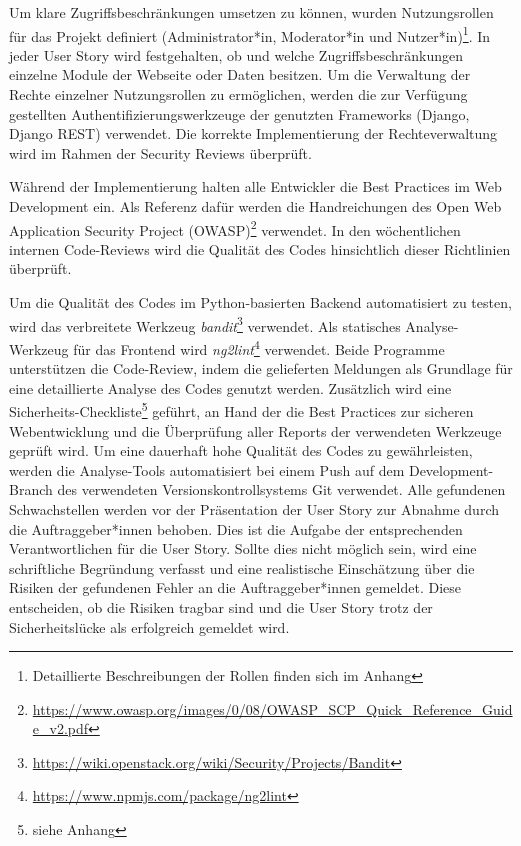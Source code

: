 \documentclass[accentcolor=tud0b,12pt,paper=a4]{tudreport}
\begin{document}
Um klare Zugriffsbeschränkungen umsetzen zu können, wurden Nutzungsrollen für das Projekt definiert (Administrator*in, Moderator*in und Nutzer*in)\footnote{Detaillierte Beschreibungen der Rollen finden sich im Anhang}. In jeder User Story wird festgehalten, ob und welche Zugriffsbeschränkungen einzelne Module der Webseite oder Daten besitzen. Um die Verwaltung der Rechte einzelner Nutzungsrollen zu ermöglichen, werden die zur Verfügung gestellten Authentifizierungswerkzeuge der genutzten Frameworks (Django, Django REST) verwendet. Die korrekte Implementierung der Rechteverwaltung wird im Rahmen der Security Reviews überprüft.

Während der Implementierung halten alle Entwickler die Best Practices im Web Development ein. Als Referenz dafür werden die Handreichungen des Open Web Application Security Project (OWASP)\footnote{\href{https://www.owasp.org/images/0/08/OWASP_SCP_Quick_Reference_Guide_v2.pdf}{https://www.owasp.org/images/0/08/OWASP\_SCP\_Quick\_Reference\_Guide\_v2.pdf}} verwendet. In den wöchentlichen internen Code-Reviews wird die Qualität des Codes hinsichtlich dieser Richtlinien überprüft.

Um die Qualität des Codes im Python-basierten Backend automatisiert zu testen, wird das verbreitete Werkzeug \emph{bandit}\footnote{\href{https://wiki.openstack.org/wiki/Security/Projects/Bandit}{https://wiki.openstack.org/wiki/Security/Projects/Bandit}} verwendet. Als statisches Analyse-Werkzeug für das Frontend wird \emph{ng2lint}\footnote{\href{https://www.npmjs.com/package/ng2lint}{https://www.npmjs.com/package/ng2lint}} verwendet. Beide Programme unterstützen die Code-Review, indem die gelieferten Meldungen als Grundlage für eine detaillierte Analyse des Codes genutzt werden. Zusätzlich wird eine Sicherheits-Checkliste\footnote{siehe Anhang} geführt, an Hand der die Best Practices zur sicheren Webentwicklung und die Überprüfung aller Reports der verwendeten Werkzeuge geprüft wird. Um eine dauerhaft hohe Qualität des Codes zu gewährleisten, werden die Analyse-Tools automatisiert bei einem Push auf dem Development-Branch des verwendeten Versionskontrollsystems Git verwendet. Alle gefundenen Schwachstellen werden vor der Präsentation der User Story zur Abnahme durch die Auftraggeber*innen behoben. Dies ist die Aufgabe der entsprechenden Verantwortlichen für die User Story. Sollte dies nicht möglich sein, wird eine schriftliche Begründung verfasst und eine realistische Einschätzung über die Risiken der gefundenen Fehler an die Auftraggeber*innen gemeldet. Diese entscheiden, ob die Risiken tragbar sind und die User Story trotz der Sicherheitslücke als erfolgreich gemeldet wird.
\end{document}
